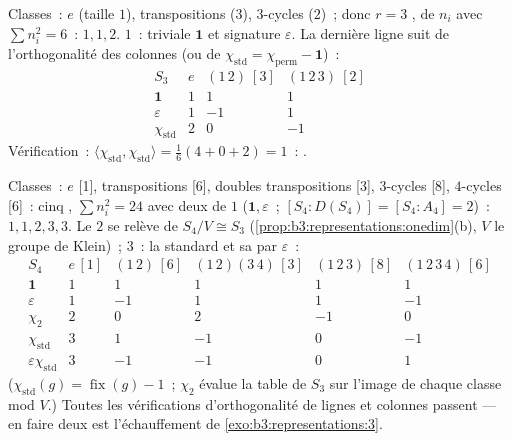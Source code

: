 \begin{example}[La table de $S_3$]\label{ex:b3:representations:s3}
Classes~: $e$ (taille $1$), transpositions ($3$), $3$-cycles
($2$)~; donc $r = 3$ , de  $n_i$ avec $\sum
n_i^2 = 6$~: $1, 1, 2$.  $1$~: triviale $\mathbf 1$ et
signature $\varepsilon$. La dernière ligne suit de
l'orthogonalité des colonnes (ou de $\chi_{\mathrm{std}} =
\chi_{\mathrm{perm}} - \mathbf 1$)~:
\[
\begin{array}{c|ccc}
S_3 & e & (1\,2)\ [3] & (1\,2\,3)\ [2]\\
\hline
\mathbf 1 & 1 & 1 & 1\\
\varepsilon & 1 & -1 & 1\\
\chi_{\mathrm{std}} & 2 & 0 & -1
\end{array}
\]
Vérification~: $\langle\chi_{\mathrm{std}},\chi_{\mathrm{std}}
\rangle = \frac{1}{6}(4 + 0 + 2) = 1$~: .
\end{example}

\begin{example}[La table de $S_4$]\label{ex:b3:representations:s4}
Classes~: $e$ [1], transpositions [6], doubles transpositions
[3], $3$-cycles [8], $4$-cycles [6]~: cinq , $\sum
n_i^2 = 24$ avec deux de  $1$ ($\mathbf 1, \varepsilon$~;
$[S_4 : D(S_4)] = [S_4 : A_4] = 2$)~:  $1, 1, 2, 3, 3$.
Le  $2$ se relève de $S_4/V \cong S_3$
(\cref{prop:b3:representations:onedim}(b), $V$ le groupe de
Klein)~;  $3$~: la  standard et sa
 par $\varepsilon$~:
\[
\begin{array}{c|ccccc}
S_4 & e\,[1] & (1\,2)\,[6] & (1\,2)(3\,4)\,[3] &
(1\,2\,3)\,[8] & (1\,2\,3\,4)\,[6]\\
\hline
\mathbf 1 & 1 & 1 & 1 & 1 & 1\\
\varepsilon & 1 & -1 & 1 & 1 & -1\\
\chi_2 & 2 & 0 & 2 & -1 & 0\\
\chi_{\mathrm{std}} & 3 & 1 & -1 & 0 & -1\\
\varepsilon\chi_{\mathrm{std}} & 3 & -1 & -1 & 0 & 1
\end{array}
\]
($\chi_{\mathrm{std}}(g) = \operatorname{fix}(g) - 1$~;
$\chi_2$ évalue la table de $S_3$ sur l'image de chaque classe
mod $V$.) Toutes les vérifications d'orthogonalité de lignes et
colonnes passent --- en faire deux est l'échauffement de
\cref{exo:b3:representations:3}.
\end{example}


